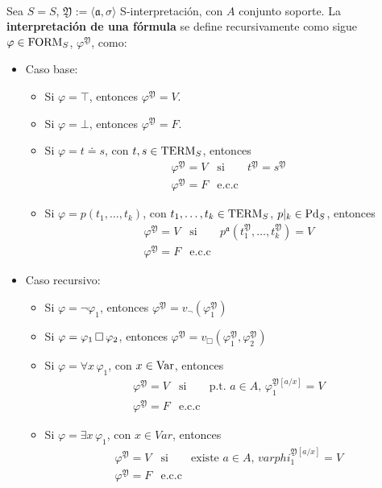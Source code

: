\paragraph{}
\begin{definition}
Sea $S = \si{S}$, $\mathfrak{Y} := \langle \mathfrak{a}, \sigma \rangle$ S-interpretación, con $A$ conjunto soporte. La \textbf{interpretación de una fórmula} se define recursivamente como sigue $\varphi \in \mbox{FORM}_{S}$, $\varphi^{\mathfrak{Y}}$, como:
\begin{itemize}
    \item Caso base:
        \begin{itemize}
            \item Si $\varphi = \top$, entonces $\varphi^{\mathfrak{Y}} = V$.
            \item Si $\varphi = \bot$, entonces $\varphi^{\mathfrak{Y}} = F$.
            \item Si $\varphi = t \doteq s$, con $t, s \in \mbox{TERM}_{S}$, entonces 
\[ \begin{matrix}
\varphi^{\mathfrak{Y}} = V & \mbox{si} & t^{\mathfrak{Y}} = s^{\mathfrak{Y}}\\
\varphi^{\mathfrak{Y}} = F & \mbox{e.c.c} 
\end{matrix} \]            
            \item Si $\varphi = p(t_1, \dots, t_k)$, con $t_1, \dots, t_k \in \mbox{TERM}_{S}$, $p\vert_k \in \mbox{Pd}_{S}$, entonces 
            \[ \begin{matrix}
\varphi^{\mathfrak{Y}} = V & \mbox{si} &p^{\mathfrak{a}}(t_{1}^{\mathfrak{Y}}, \dots, t_{k}^{\mathfrak{Y}}) = V\\
\varphi^{\mathfrak{Y}} = F & \mbox{e.c.c} 
\end{matrix} \]  
        \end{itemize}
    \item Caso recursivo:
        \begin{itemize}
            \item Si $\varphi = \neg \varphi_1$, entonces  $\varphi^{\mathfrak{Y}} = v_{\neg}(\varphi_{1}^{\mathfrak{Y}})$
            \item Si $\varphi = \varphi_1 \, \Box \, \varphi_2$, entonces $\varphi^{\mathfrak{Y}} = v_{\Box}(\varphi_{1}^{\mathfrak{Y}}, \varphi_{2}^{\mathfrak{Y}})$
            \item Si $\varphi = \forall x \, \varphi_1$, con $x \in \mbox{Var}$, entonces 
            \[ \begin{matrix}
\varphi^{\mathfrak{Y}} = V & \mbox{si} & \mbox{p.t. } a \in A, \, \varphi_1^{\mathfrak{Y}[a/x]} = V\\
\varphi^{\mathfrak{Y}} = F & \mbox{e.c.c} 
\end{matrix} \]  
            \item Si $\varphi = \exists x \, \varphi_1$, con $x \in Var$, entonces
            \[ \begin{matrix}
\varphi^{\mathfrak{Y}} = V & \mbox{si} & \mbox{existe } a \in A, \, varphi_1^{\mathfrak{Y}[a/x]} = V\\
\varphi^{\mathfrak{Y}} = F & \mbox{e.c.c} 
\end{matrix} \]   
        \end{itemize}
\end{itemize}
\end{definition}